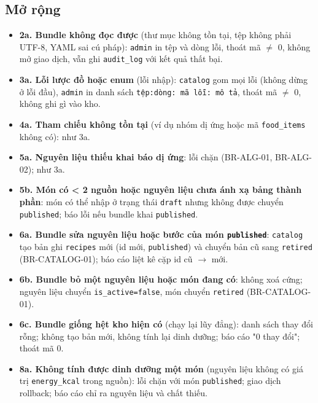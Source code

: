 \subsection{Mở rộng}
\begin{itemize}
\item \textbf{2a. Bundle không đọc được} (thư mục không tồn tại, tệp không phải UTF-\allowbreak{}8, YAML sai cú pháp): {\small\texttt{admin}} in tệp và dòng lỗi, thoát mã \ensuremath{\neq} 0, không mở giao dịch, vẫn ghi {\small\texttt{audit\_\allowbreak{}\allowbreak{}log}} với kết quả thất bại.
\item \textbf{3a. Lỗi lược đồ hoặc enum} (lỗi nhập): {\small\texttt{catalog}} gom mọi lỗi (không dừng ở lỗi đầu), {\small\texttt{admin}} in danh sách {\small\texttt{tệp:dòng: mã lỗi: mô tả}}, thoát mã \ensuremath{\neq} 0, không ghi gì vào kho.
\item \textbf{4a. Tham chiếu không tồn tại} (ví dụ nhóm dị ứng hoặc mã {\small\texttt{food\_\allowbreak{}\allowbreak{}items}} không có): như 3a.
\item \textbf{5a. Nguyên liệu thiếu khai báo dị ứng}: lỗi chặn (BR-\allowbreak{}ALG-\allowbreak{}01, BR-\allowbreak{}ALG-\allowbreak{}02); như 3a.
\item \textbf{5b. Món có < 2 nguồn hoặc nguyên liệu chưa ánh xạ bảng thành phần}: món có thể nhập ở trạng thái {\small\texttt{draft}} nhưng không được chuyển {\small\texttt{published}}; báo lỗi nếu bundle khai {\small\texttt{published}}.
\item \textbf{6a. Bundle sửa nguyên liệu hoặc bước của món {\small\texttt{published}}}: {\small\texttt{catalog}} tạo bản ghi {\small\texttt{recipes}} mới (id mới, {\small\texttt{published}}) và chuyển bản cũ sang {\small\texttt{retired}} (BR-\allowbreak{}CATALOG-\allowbreak{}01); báo cáo liệt kê cặp id cũ \ensuremath{\rightarrow} mới.
\item \textbf{6b. Bundle bỏ một nguyên liệu hoặc món đang có}: không xoá cứng; nguyên liệu chuyển {\small\texttt{is\_\allowbreak{}\allowbreak{}active=false}}, món chuyển {\small\texttt{retired}} (BR-\allowbreak{}CATALOG-\allowbreak{}01).
\item \textbf{6c. Bundle giống hệt kho hiện có} (chạy lại lũy đẳng): danh sách thay đổi rỗng; không tạo bản mới, không tính lại dinh dưỡng; báo cáo "0 thay đổi"; thoát mã 0.
\item \textbf{8a. Không tính được dinh dưỡng một món} (nguyên liệu không có giá trị {\small\texttt{energy\_\allowbreak{}\allowbreak{}kcal}} trong nguồn): lỗi chặn với món {\small\texttt{published}}; giao dịch rollback; báo cáo chỉ ra nguyên liệu và chất thiếu.

\end{itemize}
